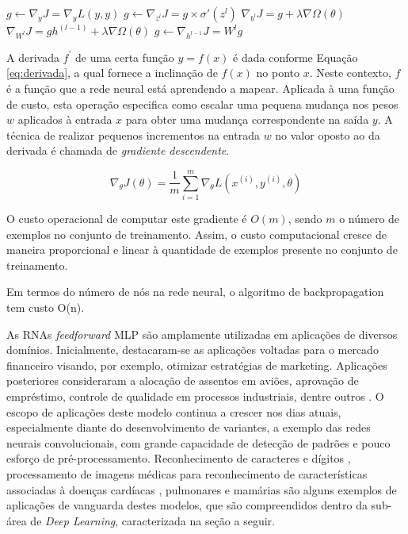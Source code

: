 \begin{algorithm}
	\begin{algorithmic}
		\State $g \gets \nabla_y J = \nabla_y L(y,y)$
			\State $g \gets \nabla_{z^l} J = g \times \sigma'(z^l) $
			\State $\nabla_{b^l} J = g + \lambda \nabla \Omega(\theta)$
			\State $\nabla_{W^l} J = g h^(l-1) + \lambda \nabla \Omega(\theta)$
			\State $g \gets \nabla_{h^{l-1}} J = W^l g$
		\EndFor
	\end{algorithmic}
\end{algorithm}

A derivada $f^\prime$ de uma certa função $y = f(x)$ é dada conforme Equação \ref{eq:derivada}, a qual fornece a inclinação de $f(x)$ no ponto $x$. Neste contexto, $f$ é a função que a rede neural está aprendendo a mapear. Aplicada à uma função de custo, esta operação especifica como escalar uma pequena mudança nos pesos $w$ aplicados à entrada $x$ para obter uma mudança correspondente na saída $y$. A técnica de realizar pequenos incrementos na entrada $w$ no valor oposto ao da derivada é chamada de \emph{gradiente descendente}. 

\begin{equation}\label{eq:gradiente}
	\nabla_{\theta} J(\theta) = \frac{1}{m} \sum_{i=1}^{m} \nabla_{\theta} L(x^{(i)}, y^{(i)}, \theta)
\end{equation}

O custo operacional de computar este gradiente é $O(m)$, sendo $m$ o número de exemplos no conjunto de treinamento. Assim, o custo computacional cresce de maneira proporcional e linear à quantidade de exemplos presente no conjunto de treinamento.

Em termos do número de nós na rede neural, o algoritmo de backpropagation tem custo O(n).

As RNAs \emph{feedforward} MLP são amplamente utilizadas em aplicações de diversos domínios. Inicialmente, destacaram-se as aplicações voltadas para o mercado financeiro visando, por exemplo, otimizar estratégias de marketing. Aplicações posteriores consideraram a alocação de assentos em aviões, aprovação de empréstimo, controle de qualidade em processos industriais, dentre outros \cite{widrow1994neural}. O escopo de aplicações deste modelo continua a crescer nos dias atuais, especialmente diante do desenvolvimento de variantes, a exemplo das redes neurais convolucionais, com grande capacidade de detecção de padrões e pouco esforço de pré-processamento. Reconhecimento de caracteres e dígitos  \cite{lenet}, processamento de imagens médicas para reconhecimento de características associadas à doenças cardíacas \cite{oktay2018anatomically}, pulmonares \cite{mingchen2018holistic} e mamárias \cite{dubrovina2018mammography} são alguns exemplos de aplicações de vanguarda destes modelos, que são compreendidos dentro da sub-área de \emph{Deep Learning}, caracterizada na seção a seguir.
